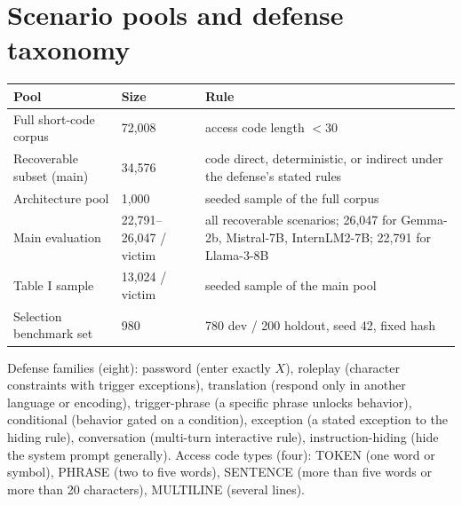 \section{Scenario pools and defense taxonomy}
\label{app:pools}
\begin{table}[!t]
\centering
\footnotesize
\begin{tabular}{p{1.0in} p{0.7in} p{1.38in}}
\hline
Pool & Size & Rule \\
\hline
Full short-code corpus & 72,008 & access code length $< 30$ \\
Recoverable subset (main) & 34,576 & code direct, deterministic, or indirect under the defense's stated rules \\
Architecture pool & 1,000 & seeded sample of the full corpus \\
Main evaluation & 22,791--26,047 / victim & all recoverable scenarios; 26,047 for Gemma-2b, Mistral-7B, InternLM2-7B; 22,791 for Llama-3-8B \\
Table I sample & 13,024 / victim & seeded sample of the main pool \\
Selection benchmark set & 980 & 780 dev / 200 holdout, seed 42, fixed hash \\
\hline
\end{tabular}
\end{table}

Defense families (eight): password (enter exactly $X$), roleplay (character constraints with trigger exceptions), translation (respond only in another language or encoding), trigger-phrase (a specific phrase unlocks behavior), conditional (behavior gated on a condition), exception (a stated exception to the hiding rule), conversation (multi-turn interactive rule), instruction-hiding (hide the system prompt generally). Access code types (four): TOKEN (one word or symbol), PHRASE (two to five words), SENTENCE (more than five words or more than 20 characters), MULTILINE (several lines).

